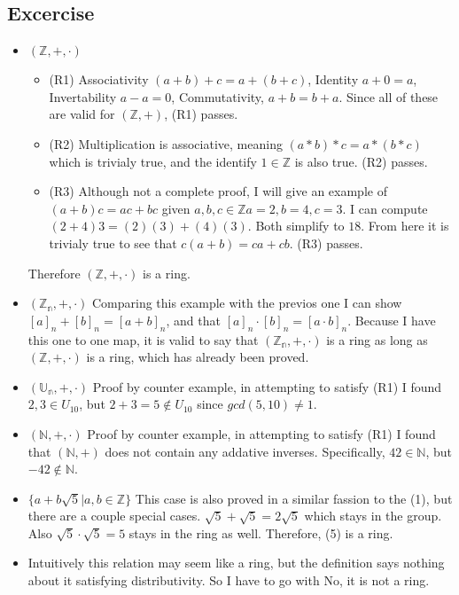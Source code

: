 \documentclass{article}
\begin{document}
\subsection{Excercise}
\begin{itemize}
	\item $(\mathbb{Z}, +, \cdot)$
	\begin{itemize}
		\item (R1) Associativity $(a + b) + c = a + (b + c)$, Identity $a + 0 = a$, Invertability $a - a = 0$, Commutativity, $a + b = b + a$. Since all of these are valid for $(\mathbb{Z}, +)$, (R1) passes.
		\item (R2) Multiplication is associative, meaning $(a * b) * c = a * (b * c)$ which is trivialy true, and the identify $1 \in \mathbb{Z}$ is also true. (R2) passes.
		\item (R3) Although not a complete proof, I will give an example of $(a + b)c = ac + bc$ given $a, b, c \in \mathbb{Z} a = 2, b = 4, c = 3$. I can compute $(2 + 4)3 = (2)(3) + (4)(3)$. Both simplify to $18$. From here it is trivialy true to see that $c(a + b) = ca + cb$. (R3) passes.
	\end{itemize}
	Therefore $(\mathbb{Z}, +, \cdot)$ is a ring.
	\item $(\mathbb{Z_n}, +, \cdot)$ Comparing this example with the previos one I can show $[a]_n + [b]_n = [a+b]_n$, and that $[a]_n \cdot [b]_n = [a \cdot b]_n$. Because I have this one to one map, it is valid to say that $(\mathbb{Z_n}, +, \cdot)$ is a ring as long as $(\mathbb{Z}, +, \cdot)$ is a ring, which has already been proved.
	\item $(\mathbb{U_n}, +, \cdot)$ Proof by counter example, in attempting to satisfy (R1) I found $2, 3 \in U_{10}$, but $2 + 3 = 5 \notin U_{10}$ since $gcd(5,10) \neq 1$.
	\item $(\mathbb{N}, +, \cdot)$ Proof by counter example, in attempting to satisfy (R1) I found that $(\mathbb{N}, +)$ does not contain any addative inverses. Specifically, $42 \in \mathbb{N}$, but $-42 \notin \mathbb{N}$.
	\item $\{a + b \sqrt{5} | a, b \in \mathbb{Z}\}$ This case is also proved in a similar fassion to the (1), but there are a couple special cases. $\sqrt{5} + \sqrt{5} = 2 \sqrt{5}$ which stays in the group. Also $\sqrt{5} \cdot \sqrt{5} = 5$ stays in the ring as well. Therefore, (5) is a ring.
	\item Intuitively this relation may seem like a ring, but the definition says nothing about it satisfying distributivity. So I have to go with No, it is not a ring.
\end{itemize}
\end{document}
